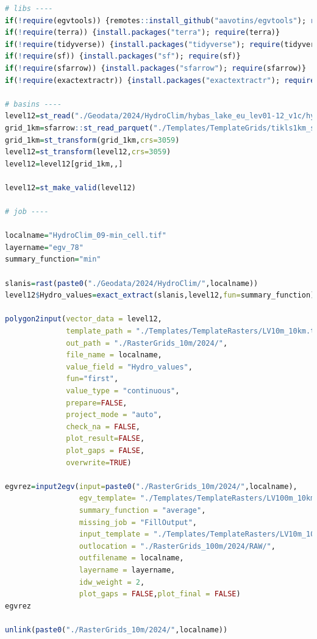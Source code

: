 \documentclass[
]{book}
\begin{document}
\begin{lstlisting}[language=R]
# libs ----
if(!require(egvtools)) {remotes::install_github("aavotins/egvtools"); require(egvtools)}
if(!require(terra)) {install.packages("terra"); require(terra)}
if(!require(tidyverse)) {install.packages("tidyverse"); require(tidyverse)}
if(!require(sf)) {install.packages("sf"); require(sf)}
if(!require(sfarrow)) {install.packages("sfarrow"); require(sfarrow)}
if(!require(exactextractr)) {install.packages("exactextractr"); require(exactextractr)}

# basins ----
level12=st_read("./Geodata/2024/HydroClim/hybas_lake_eu_lev01-12_v1c/hybas_lake_eu_lev12_v1c.shp")
grid_1km=sfarrow::st_read_parquet("./Templates/TemplateGrids/tikls1km_sauzeme.parquet")
grid_1km=st_transform(grid_1km,crs=3059)
level12=st_transform(level12,crs=3059)
level12=level12[grid_1km,,]

level12=st_make_valid(level12)

# job ----

localname="HydroClim_09-min_cell.tif"
layername="egv_78"
summary_function="min"
  
slanis=rast(paste0("./Geodata/2024/HydroClim/",localname))
level12$Hydro_values=exact_extract(slanis,level12,fun=summary_function)
  
polygon2input(vector_data = level12,
              template_path = "./Templates/TemplateRasters/LV10m_10km.tif",
              out_path = "./RasterGrids_10m/2024/",
              file_name = localname,
              value_field = "Hydro_values",
              fun="first",
              value_type = "continuous",
              prepare=FALSE,
              project_mode = "auto",
              check_na = FALSE,
              plot_result=FALSE,
              plot_gaps = FALSE,
              overwrite=TRUE)
  
egvrez=input2egv(input=paste0("./RasterGrids_10m/2024/",localname),
                 egv_template= "./Templates/TemplateRasters/LV100m_10km.tif",
                 summary_function = "average",
                 missing_job = "FillOutput",
                 input_template = "./Templates/TemplateRasters/LV10m_10km.tif",
                 outlocation = "./RasterGrids_100m/2024/RAW/",
                 outfilename = localname,
                 layername = layername,
                 idw_weight = 2,
                 plot_gaps = FALSE,plot_final = FALSE)
egvrez
  
unlink(paste0("./RasterGrids_10m/2024/",localname))
\end{lstlisting}
\end{document}
